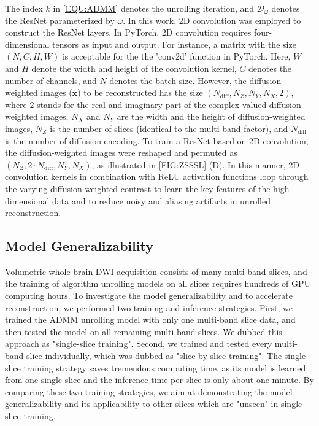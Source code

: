 \documentclass[journal,twoside,web]{ieeecolor}
\begin{document}
	The index $k$ in \cref{EQU:ADMM} denotes the unrolling iteration,
	and $\mathcal{D}_{\omega}$ denotes the ResNet \cite{he_2016_resnet}
	parameterized by $\omega$.
	In this work, 2D convolution was employed to construct the ResNet layers.
	In PyTorch, 2D convolution requires four-dimensional tensors as input and output.
	For instance, a matrix with the size $(N, C, H, W)$ is acceptable
	for the the 'conv2d' function in PyTorch.
	Here, $W$ and $H$ denote the width and height of the convolution kernel,
	$C$ denotes the number of channels, and $N$ denotes the batch size.
	However, the diffusion-weighted images ($\mathbf{x}$) to be reconstructed
	has the size $(N_{\text{diff}}, N_Z, N_Y, N_X, 2)$,
	where $2$ stands for the real and imaginary part 
	of the complex-valued diffusion-weighted images,
	$N_X$ and $N_Y$ are the width and the height of diffusion-weighted images,
	$N_Z$ is the number of slices (identical to the multi-band factor), and
	$N_{\text{diff}}$ is the number of diffusion encoding.
	To train a ResNet based on 2D convolution, 
	the diffusion-weighted images were reshaped and permuted
	as $(N_Z, 2 \cdot N_{\text{diff}}, N_Y, N_X)$, as illustrated in \cref{FIG:ZSSSL} (D).
	In this manner, 2D convolution kernels in combination with ReLU activation functions
	loop through the varying diffusion-weighted contrast
	to learn the key features of the high-dimensional data and
	to reduce noisy and aliasing artifacts in unrolled reconstruction.
	
	\subsection{Model Generalizability} \label{SEC:ZSSSL_GEN}
	
	Volumetric whole brain DWI acquisition consists of many multi-band slices, 
	and the training of algorithm unrolling models on all slices requires 
	hundreds of GPU computing hours. 
	To investigate the model generalizability and to accelerate reconstruction, 
	we performed two training and inference strategies. 
	First, we trained the ADMM unrolling model with only one multi-band slice data, 
	and then tested the model on all remaining multi-band slices. 
	We dubbed this approach as "single-slice training". 
	Second, we trained and tested every multi-band slice individually, 
	which was dubbed as "slice-by-slice training". 
	The single-slice training strategy saves tremendous computing time, 
	as its model is learned from one single slice and 
	the inference time per slice is only about one minute. 
	By comparing these two training strategies, 
	we aim at demonstrating the model generalizability and 
	its applicability to other slices which are "unseen" in single-slice training.
\end{document}
